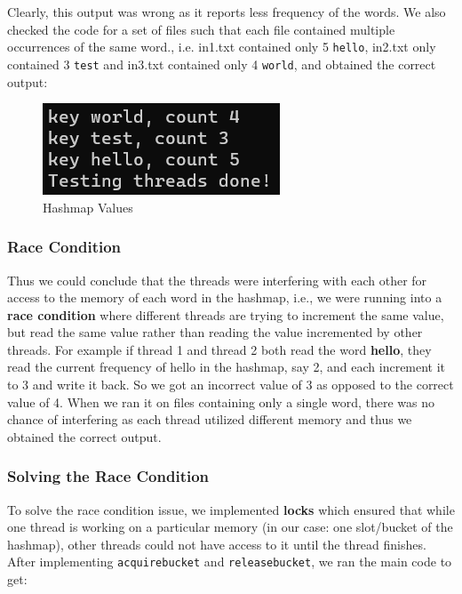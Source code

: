 \documentclass[notitlepage]{report}
\begin{document}
\noindent Clearly, this output was wrong as it reports less frequency of the words. 
\newline
\newline
\noindent We also checked the code for a set of files such that each file contained multiple occurrences of the same word., i.e. in1.txt contained only 5 \texttt{hello}, in2.txt only contained 3 \texttt{test} and in3.txt contained only 4 \texttt{world}, and obtained the correct output:

\begin{figure}[hbp]
    \centering
    \includegraphics[width = 0.35\linewidth]{checpoint3_wrongOut_samewords.png}
    \caption*{Hashmap Values}
\end{figure}

\pagebreak
\subsubsection*{Race Condition}
\noindent Thus we could conclude that the threads were interfering with each other for access to the memory of each word in the hashmap, i.e., we were running into a \textbf{race condition} where different threads are trying to increment the same value, but read the same value rather than reading the value incremented by other threads. 
\newline
\noindent For example if thread 1 and thread 2 both read the word \textbf{hello}, they read the current frequency of hello in the hashmap, say 2, and each increment it to 3 and write it back. So we got an incorrect value of 3 as opposed to the correct value of 4. 
\newline
\newline
\noindent When we ran it on files containing only a single word, there was no chance of interfering as each thread utilized different memory and thus we obtained the correct output.

\subsubsection*{Solving the Race Condition}
To solve the race condition issue, we implemented \textbf{locks} which ensured that while one thread is working on a particular memory (in our case: one slot/bucket of the hashmap), other threads could not have access to it until the thread finishes. 
\newline
\newline
\noindent After implementing \texttt{acquire\textunderscore bucket} and \texttt{release\textunderscore bucket}, we ran the main code to get:
\end{document}
